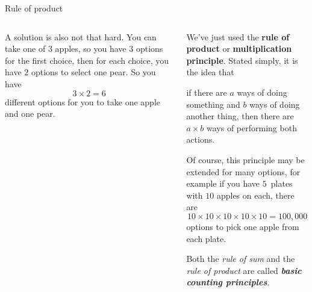 \documentclass[9pt,aspectratio=169]{beamer}
\begin{document}
\begin{frame}{Rule of product}
\begin{columns}[T]
\begin{column}{0.5\textwidth}
      A solution is also not that hard. You can take one of $3$ apples, so you have $3$ options for the first choice, then for each choice, you have $2$ options to select one pear. So you have 
      \[3 \times 2 = 6\] 
      different options for you to take one apple and one pear.

    \end{column}
    \begin{column}{0.5\textwidth}
      We've just used the \textbf{rule of product} or \textbf{multiplication principle}. Stated simply, it is the idea that 
      \begin{definition}
        if there are $a$ ways of doing something and $b$ ways of doing another thing, then there are $a \times b$ ways of performing both actions.
      \end{definition}

      Of course, this principle may be extended for many options, for example if you have $5$~plates with $10$ apples on each, there are
      \[ 10 \times 10 \times 10 \times 10 \times 10 = 100,000 \]
      options to pick one apple from each plate.

      \vspace*{1em}

      \begin{example}
        Both the \emph{rule of sum} and the \emph{rule of product} are called \emph{\textbf{basic counting principles}}.
      \end{example}
    \end{column}
  \end{columns}
\end{frame}
\end{document}
